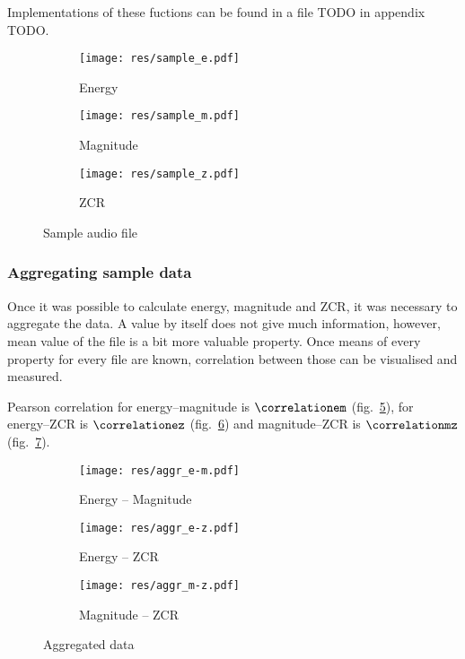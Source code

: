 \documentclass[english,11pt]{article}
\numberwithin{equation}{section}
\begin{document}
Implementations of these fuctions can be found in a file TODO in
appendix TODO.

\begin{figure}
    \centering
    \begin{subfigure}[b]{0.6\textwidth}
        \texttt{[image: res/sample\_e.pdf]}
        \caption{Energy}
        \label{fig:sample_e}
    \end{subfigure}

    \begin{subfigure}[b]{0.6\textwidth}
        \texttt{[image: res/sample\_m.pdf]}
        \caption{Magnitude}
        \label{fig:sample_m}
    \end{subfigure}

    \begin{subfigure}[b]{0.6\textwidth}
        \texttt{[image: res/sample\_z.pdf]}
        \caption{ZCR}
        \label{fig:sample_z}
    \end{subfigure}
    \caption{Sample audio file}\label{fig:sample}
\end{figure}

\subsubsection{Aggregating sample data}

Once it was possible to calculate energy, magnitude and ZCR, it was necessary
to aggregate the data. A value by itself does not give much information,
however, mean value of the file is a bit more valuable property. Once means of
every property for every file are known, correlation between those can be
visualised and measured.

Pearson correlation for energy--magnitude is $\correlationem$
(fig.~\ref{fig:aggr_e-m}), for energy--ZCR is $\correlationez$
(fig.~\ref{fig:aggr_e-z}) and magnitude--ZCR is $\correlationmz$
(fig.~\ref{fig:aggr_m-z}).

\begin{figure}
    \centering
    \begin{subfigure}[b]{0.6\textwidth}
        \texttt{[image: res/aggr\_e-m.pdf]}
        \caption{Energy -- Magnitude}
        \label{fig:aggr_e-m}
    \end{subfigure}

    \begin{subfigure}[b]{0.6\textwidth}
        \texttt{[image: res/aggr\_e-z.pdf]}
        \caption{Energy -- ZCR}
        \label{fig:aggr_e-z}
    \end{subfigure}

    \begin{subfigure}[b]{0.6\textwidth}
        \texttt{[image: res/aggr\_m-z.pdf]}
        \caption{Magnitude -- ZCR}
        \label{fig:aggr_m-z}
    \end{subfigure}
    \caption{Aggregated data}\label{fig:aggr}
\end{figure}
\end{document}
